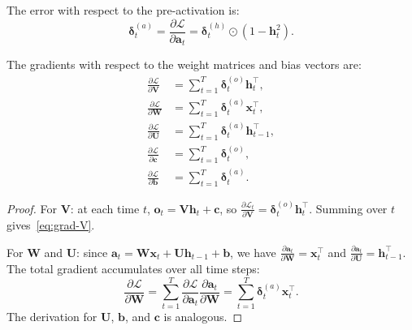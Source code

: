 \documentclass[11pt,a4paper]{article}
\begin{document}
\begin{definition}
\label{def:pre-activation-error}
The error with respect to the pre-activation is:
\begin{equation}
  \boldsymbol{\delta}_t^{(a)} = \frac{\partial \mathcal{L}}
    {\partial \mathbf{a}_t}
    = \boldsymbol{\delta}_t^{(h)} \odot (1 - \mathbf{h}_t^2).
  \label{eq:pre-activation-error}
\end{equation}
\end{definition}

\begin{theorem}
\label{thm:weight-gradients}
The gradients with respect to the weight matrices and bias vectors are:
\begin{align}
  \frac{\partial \mathcal{L}}{\partial \mathbf{V}}
    &= \sum_{t=1}^{T} \boldsymbol{\delta}_t^{(o)}
       \mathbf{h}_t^\top, \label{eq:grad-V} \\
  \frac{\partial \mathcal{L}}{\partial \mathbf{W}}
    &= \sum_{t=1}^{T} \boldsymbol{\delta}_t^{(a)}
       \mathbf{x}_t^\top, \label{eq:grad-W} \\
  \frac{\partial \mathcal{L}}{\partial \mathbf{U}}
    &= \sum_{t=1}^{T} \boldsymbol{\delta}_t^{(a)}
       \mathbf{h}_{t-1}^\top, \label{eq:grad-U} \\
  \frac{\partial \mathcal{L}}{\partial \mathbf{c}}
    &= \sum_{t=1}^{T} \boldsymbol{\delta}_t^{(o)},
       \label{eq:grad-c} \\
  \frac{\partial \mathcal{L}}{\partial \mathbf{b}}
    &= \sum_{t=1}^{T} \boldsymbol{\delta}_t^{(a)}.
       \label{eq:grad-b}
\end{align}
\end{theorem}

\begin{proof}
For $\mathbf{V}$: at each time $t$, $\mathbf{o}_t =
\mathbf{V}\mathbf{h}_t + \mathbf{c}$, so
$\frac{\partial \mathcal{L}_t}{\partial \mathbf{V}} =
\boldsymbol{\delta}_t^{(o)} \mathbf{h}_t^\top$.  Summing over $t$
gives~\eqref{eq:grad-V}.

For $\mathbf{W}$ and $\mathbf{U}$: since
$\mathbf{a}_t = \mathbf{W}\mathbf{x}_t +
\mathbf{U}\mathbf{h}_{t-1} + \mathbf{b}$, we have
$\frac{\partial \mathbf{a}_t}{\partial \mathbf{W}} = \mathbf{x}_t^\top$
and $\frac{\partial \mathbf{a}_t}{\partial \mathbf{U}} =
\mathbf{h}_{t-1}^\top$.  The total gradient accumulates over all
time steps:
\[
  \frac{\partial \mathcal{L}}{\partial \mathbf{W}}
    = \sum_{t=1}^{T} \frac{\partial \mathcal{L}}
      {\partial \mathbf{a}_t}
      \frac{\partial \mathbf{a}_t}{\partial \mathbf{W}}
    = \sum_{t=1}^{T} \boldsymbol{\delta}_t^{(a)} \mathbf{x}_t^\top.
\]
The derivation for $\mathbf{U}$, $\mathbf{b}$, and $\mathbf{c}$
is analogous.
\end{proof}
\end{document}
